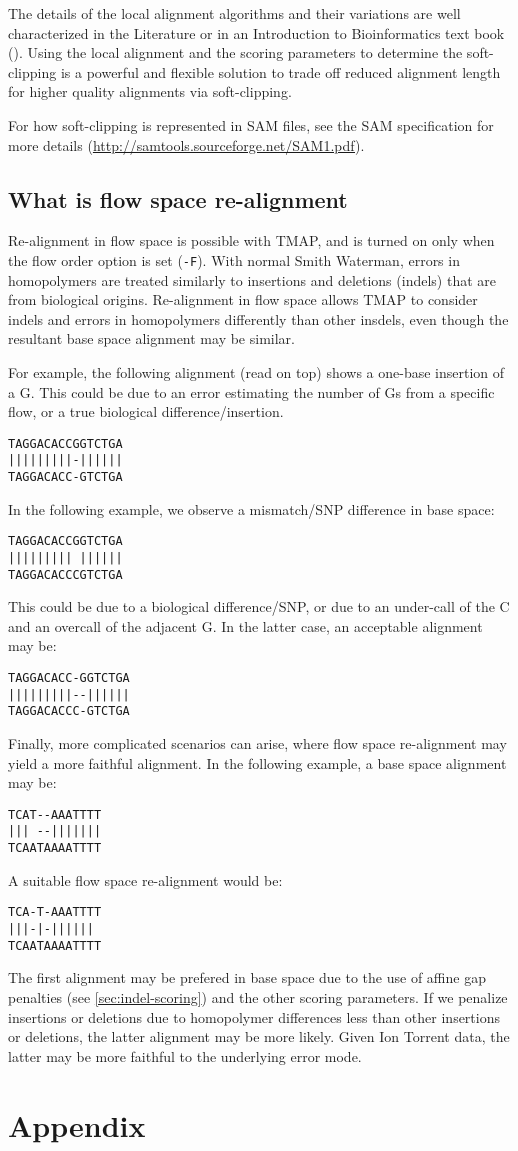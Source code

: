 \documentclass[a4paper,12pt]{book}
\newcommand{\TT}[1]{{\tt #1}} %
\begin{document}
The details of the local alignment algorithms and their variations are well characterized in the Literature or in an Introduction to Bioinformatics text book (\cite{jones2004}).  
Using the local alignment and the scoring parameters to determine the soft-clipping is a powerful and flexible solution to trade off reduced alignment length for higher quality alignments via soft-clipping.

For how soft-clipping is represented in SAM files, see the SAM specification for more details (\url{http://samtools.sourceforge.net/SAM1.pdf}).

\section{What is flow space re-alignment}
\label{sec:fs-realign}
Re-alignment in flow space is possible with TMAP, and is turned on only when the flow order option is set (\TT{-F}).
With normal Smith Waterman, errors in homopolymers are treated similarly to insertions and deletions (indels) that are from biological origins.
Re-alignment in flow space allows TMAP to consider indels and errors in homopolymers differently than other insdels, even though the resultant base space alignment may be similar.

For example, the following alignment (read on top) shows a one-base insertion of a G.
This could be due to an error estimating the number of Gs from a specific flow, or a true biological difference/insertion.
\begin{verbatim}
TAGGACACCGGTCTGA
|||||||||-||||||
TAGGACACC-GTCTGA
\end{verbatim}

In the following example, we observe a mismatch/SNP difference in base space:
\begin{verbatim}
TAGGACACCGGTCTGA
||||||||| ||||||
TAGGACACCCGTCTGA
\end{verbatim}
This could be due to a biological difference/SNP, or due to an under-call of the C and an overcall of the adjacent G.
In the latter case, an acceptable alignment may be:
\begin{verbatim}
TAGGACACC-GGTCTGA
|||||||||--||||||
TAGGACACCC-GTCTGA
\end{verbatim}

Finally, more complicated scenarios can arise, where flow space re-alignment may yield a more faithful alignment.
In the following example, a base space alignment may be:
\begin{verbatim}
TCAT--AAATTTT
||| --|||||||
TCAATAAAATTTT
\end{verbatim}
A suitable flow space re-alignment would be:
\begin{verbatim}
TCA-T-AAATTTT
|||-|-||||||
TCAATAAAATTTT
\end{verbatim}
The first alignment may be prefered in base space due to the use of affine gap penalties (see \autoref{sec:indel-scoring}) and the other scoring parameters.
If we penalize insertions or deletions due to homopolymer differences less than other insertions or deletions, the latter alignment may be more likely.
Given Ion Torrent data, the latter may be more faithful to the underlying error mode.
\chapter{Appendix}

{}


\end{document}
